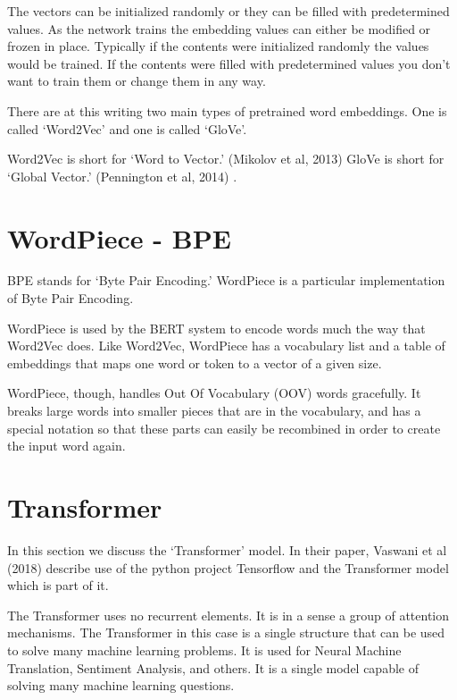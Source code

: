 The vectors can be initialized randomly or they can be filled with
predetermined values. As the network trains the embedding values can
either be modified or frozen in place. Typically if the contents were
initialized randomly the values would be trained. If the contents
were filled with predetermined values you don\textquoteright t want
to train them or change them in any way. 

There are at this writing two main types of pretrained word embeddings.
One is called \textquoteleft Word2Vec\textquoteright{} and one is
called \textquoteleft GloVe\textquoteright . 

Word2Vec is short for \textquoteleft Word to Vector.\textquoteright{}
(Mikolov et al, 2013)\cite{mikolov2013efficient} GloVe is short for \textquoteleft Global
Vector.\textquoteright{} (Pennington et al, 2014)\cite{pennington-etal-2014-glove} .


\section{WordPiece - BPE}

\ac{BPE} stands for `Byte Pair Encoding.' WordPiece is a particular implementation of Byte Pair Encoding.

WordPiece is used by the BERT system to encode words much the way that Word2Vec does.
Like Word2Vec, WordPiece  has a vocabulary list and a table of embeddings that maps one
word or token to a vector of a given size.

WordPiece, though, handles Out Of Vocabulary (OOV) words gracefully. It breaks large words
into smaller pieces that are in the vocabulary, and has a special notation so that
these parts can easily be recombined in order to create the input word again.


\section{Transformer}

In this section we discuss the `Transformer' model. In their paper, Vaswani et al (2018)\cite{tensor2tensor} describe use of the python project Tensorflow and the Transformer model which is part of it.

The Transformer uses no recurrent elements. It is in a sense a group of attention mechanisms. The Transformer in this case is a single structure that can be used to solve many machine learning problems. It is used for Neural Machine Translation, Sentiment Analysis, and others. It is a single model capable of solving many machine learning questions.

